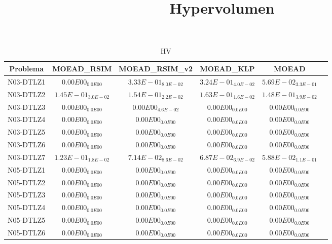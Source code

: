 \documentclass{article}
\title{Hypervolumen}
\author{}
\begin{document}
\maketitle
\begin{table*}[ht!]
\scriptsize
\caption{HV}
\centering\begin{tabular}{|c||c||c||c||c||c|} \hline
Problema &MOEAD_RSIM &MOEAD_RSIM_v2 &MOEAD_KLP &MOEAD\\\hline
N03-DTLZ1 &$0.00E00_{0.0E00}$ &\cellcolor{gray95}$3.33E-01_{8.0E-02}$ &\cellcolor{gray25}$3.24E-01_{4.0E-02}$ &$5.69E-02_{3.3E-01}$\\ 
\hline
N03-DTLZ2 &$1.45E-01_{3.0E-02}$ &\cellcolor{gray25}$1.54E-01_{2.2E-02}$ &\cellcolor{gray95}$1.63E-01_{1.6E-02}$ &$1.48E-01_{3.9E-02}$\\ 
\hline
N03-DTLZ3 &\cellcolor{gray95}$0.00E00_{0.0E00}$ &$0.00E00_{4.6E-02}$ &\cellcolor{gray25}$0.00E00_{0.0E00}$ &$0.00E00_{0.0E00}$\\ 
\hline
N03-DTLZ4 &\cellcolor{gray95}$0.00E00_{0.0E00}$ &\cellcolor{gray25}$0.00E00_{0.0E00}$ &$0.00E00_{0.0E00}$ &$0.00E00_{0.0E00}$\\ 
\hline
N03-DTLZ5 &\cellcolor{gray95}$0.00E00_{0.0E00}$ &\cellcolor{gray25}$0.00E00_{0.0E00}$ &$0.00E00_{0.0E00}$ &$0.00E00_{0.0E00}$\\ 
\hline
N03-DTLZ6 &\cellcolor{gray95}$0.00E00_{0.0E00}$ &\cellcolor{gray25}$0.00E00_{0.0E00}$ &$0.00E00_{0.0E00}$ &$0.00E00_{0.0E00}$\\ 
\hline
N03-DTLZ7 &\cellcolor{gray95}$1.23E-01_{1.8E-02}$ &\cellcolor{gray25}$7.14E-02_{8.6E-02}$ &$6.87E-02_{6.9E-02}$ &$5.88E-02_{1.1E-01}$\\ 
\hline
N05-DTLZ1 &\cellcolor{gray95}$0.00E00_{0.0E00}$ &\cellcolor{gray25}$0.00E00_{0.0E00}$ &$0.00E00_{0.0E00}$ &$0.00E00_{0.0E00}$\\ 
\hline
N05-DTLZ2 &\cellcolor{gray95}$0.00E00_{0.0E00}$ &\cellcolor{gray25}$0.00E00_{0.0E00}$ &$0.00E00_{0.0E00}$ &$0.00E00_{0.0E00}$\\ 
\hline
N05-DTLZ3 &\cellcolor{gray95}$0.00E00_{0.0E00}$ &\cellcolor{gray25}$0.00E00_{0.0E00}$ &$0.00E00_{0.0E00}$ &$0.00E00_{0.0E00}$\\ 
\hline
N05-DTLZ4 &\cellcolor{gray95}$0.00E00_{0.0E00}$ &\cellcolor{gray25}$0.00E00_{0.0E00}$ &$0.00E00_{0.0E00}$ &$0.00E00_{0.0E00}$\\ 
\hline
N05-DTLZ5 &\cellcolor{gray95}$0.00E00_{0.0E00}$ &\cellcolor{gray25}$0.00E00_{0.0E00}$ &$0.00E00_{0.0E00}$ &$0.00E00_{0.0E00}$\\ 
\hline
N05-DTLZ6 &\cellcolor{gray95}$0.00E00_{0.0E00}$ &\cellcolor{gray25}$0.00E00_{0.0E00}$ &$0.00E00_{0.0E00}$ &$0.00E00_{0.0E00}$\\ 

\end{tabular}
\end{table*}
\end{document}
